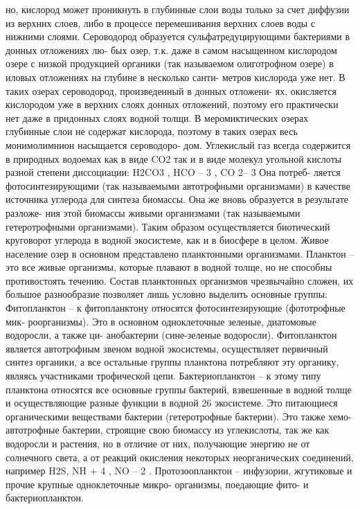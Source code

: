 но, кислород может проникнуть в глубинные слои воды только за счет диффузии из верхних
слоев, либо в процессе перемешивания верхних слоев воды с нижними слоями.
Сероводород образуется сульфатредуцирующими бактериями в донных отложениях лю-
бых озер, т.к. даже в самом насыщенном кислородом озере с низкой продукцией органики
(так называемом олиготрофном озере) в иловых отложениях на глубине в несколько санти-
метров кислорода уже нет. В таких озерах сероводород, произведенный в донных отложени-
ях, окисляется кислородом уже в верхних слоях донных отложений, поэтому его практически
нет даже в придонных слоях водной толщи. В меромиктических озерах глубинные слои не
содержат кислорода, поэтому в таких озерах весь монимолимнион насыщается сероводоро-
дом.
Углекислый газ всегда содержится в природных водоемах как в виде CO2
так и в виде
молекул угольной кислоты разной степени диссоциации: H2CO3
, HCO –
3
, CO 2–
3 Она потреб-
ляется фотосинтезирующими (так называемыми автотрофными организмами) в качестве
источника углерода для синтеза биомассы. Она же вновь образуется в результате разложе-
ния этой биомассы живыми организмами (так называемыми гетеротрофными организмами).
Таким образом осуществляется биотический круговорот углерода в водной экосистеме, как
и в биосфере в целом.
Живое население озер в основном представлено планктонными организмами. Планктон –
это все живые организмы, которые плавают в водной толще, но не способны противостоять
течению. Состав планктонных организмов чрезвычайно сложен, их большое разнообразие
позволяет лишь условно выделить основные группы:
Фитопланктон – к фитопланктону относятся фотосинтезирующие (фототрофные мик-
роорганизмы). Это в основном одноклеточные зеленые, диатомовые водоросли, а также ци-
анобактерии (сине-зеленые водоросли). Фитопланктон является автотрофным звеном водной
экосистемы, осуществляет первичный синтез органики, а все остальные группы планктона
потребляют эту органику, являясь участниками трофической цепи.
Бактериопланктон – к этому типу планктона относятся все основные группы бактерий,
взвешенные в водной толще и осуществляющие разные функции в водной 26 экосистеме.
Это питающиеся органическими веществами бактерии (гетеротрофные бактерии). Это также
хемо-автотрофные бактерии, строящие свою биомассу из углекислоты, так же как водоросли
и растения, но в отличие от них, получающие энергию не от солнечного света, а от реакций
окисления некоторых неорганических соединений, например H2S, NH +
4
, NO –
2
.
Протозоопланктон – инфузории, жгутиковые и прочие крупные одноклеточные микро-
организмы, поедающие фито- и бактериопланктон.
